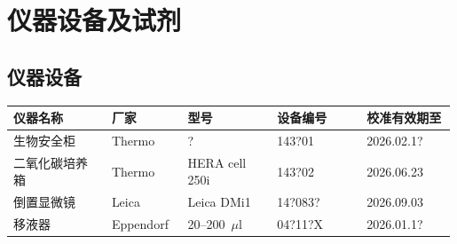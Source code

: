 \documentclass[UTF8,10pt,a4paper,fontset=fandol]{ctexart}
\newcommand{\fieldvalue}[1]{#1}
\newcommand{\handwritten}[1]{#1}
\begin{document}
\section{仪器设备及试剂}

\subsection{仪器设备}

\begin{center}
\begin{tabular}{|p{0.22\linewidth}|p{0.17\linewidth}|p{0.20\linewidth}|p{0.20\linewidth}|p{0.20\linewidth}|}
\hline
仪器名称 & 厂家 & 型号 & 设备编号 & 校准有效期至\\
\hline
\fieldvalue{生物安全柜} &
\fieldvalue{Thermo} &
\fieldvalue{\handwritten{?}} &
\fieldvalue{\handwritten{143?01}} &
\fieldvalue{\handwritten{2026.02.1?}}\\
\hline
\fieldvalue{二氧化碳培养箱} &
\fieldvalue{Thermo} &
\fieldvalue{HERA cell 250i} &
\fieldvalue{\handwritten{143?02}} &
\fieldvalue{\handwritten{2026.06.23}}\\
\hline
\fieldvalue{倒置显微镜} &
\fieldvalue{Leica} &
\fieldvalue{Leica DMi1} &
\fieldvalue{\handwritten{14?083?}} &
\fieldvalue{\handwritten{2026.09.03}}\\
\hline
\fieldvalue{移液器} &
\fieldvalue{Eppendorf} &
\fieldvalue{\handwritten{20--200~$\mu$l}} &
\fieldvalue{\handwritten{04?11?X}} &
\fieldvalue{\handwritten{2026.01.1?}}\\
\hline
\end{tabular}
\end{center}
\end{document}
